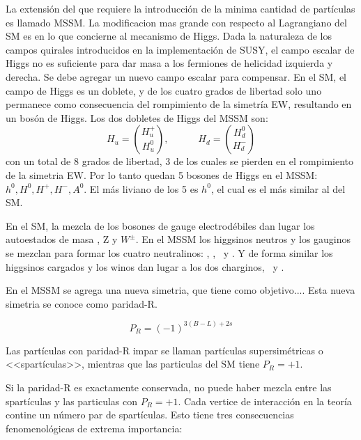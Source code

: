 La extensi\'on del {\SM} que requiere la introducci\'on de la minima cantidad de part\'iculas es llamado
MSSM. La modificacion mas grande con respecto al Lagrangiano del SM es en lo que concierne al mecanismo
de Higgs. %
Dada la naturaleza de los campos quirales introducidos en la implementación de SUSY, el campo
escalar de Higgs no es suficiente para dar masa a los fermiones de helicidad izquierda y derecha.
Se debe agregar un nuevo campo escalar para compensar. En el SM, el campo de Higgs es un doblete,
y de los cuatro grados de libertad solo uno permanece como consecuencia del rompimiento de la
simetría EW, resultando en un bos\'on de Higgs. Los dos dobletes de Higgs del MSSM son:
%
\begin{equation}
  H_u = \binom{H_u^+}{H_u^0}, \quad \quad \quad H_d = \binom{H_d^0}{H_d^-}
\end{equation}
%
con un total de 8 grados de libertad, 3 de los cuales se pierden en el rompimiento
de la simetria EW. Por lo tanto quedan 5 bosones de Higgs en el MSSM: $h^0, H^0, H^+, H^-, A^0$.
El más liviano de los 5 es $h^0$, el cual es el más similar al del SM.

En el SM, la mezcla de los bosones de gauge electrodébiles dan lugar los autoestados
de masa \gam, Z y $W^\pm$.
En el MSSM los higgsinos neutros y los gauginos se mezclan para formar los cuatro neutralinos:
\ninoone, \ninotwo, \ninothree\ y \ninofour.
Y de forma similar los higgsinos cargados y los winos dan lugar a los dos charginos, \chinoonepm\ y \chinotwopm.


En el MSSM se agrega una nueva simetria, que tiene como objetivo....
Esta nueva simetria se conoce como paridad-R.

\begin{equation}
  P_R = (-1)^{3(B-L)+ 2s}
\end{equation}

Las partículas con paridad-R impar se llaman partículas supersimétricas
o <<spartículas>>, mientras que las particulas del SM tiene $P_R = +1$.

Si la paridad-R es exactamente conservada, no puede haber mezcla entre
las spartículas y las particulas con $P_R = +1$. Cada vertice de interacción
en la teoría contine un número par de spartículas.
Esto tiene tres consecuencias fenomenológicas de extrema importancia:

